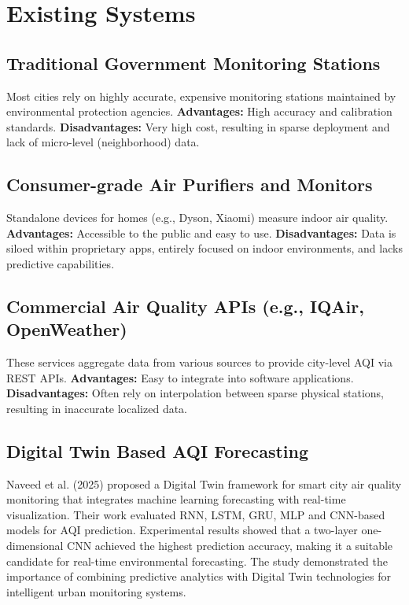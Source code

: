 \documentclass[a4paper, 12pt]{report}
\begin{document}
\section{Existing Systems}

\subsection*{Traditional Government Monitoring Stations}
Most cities rely on highly accurate, expensive monitoring stations maintained by environmental protection agencies.
\textbf{Advantages:} High accuracy and calibration standards.
\textbf{Disadvantages:} Very high cost, resulting in sparse deployment and lack of micro-level (neighborhood) data.

\subsection*{Consumer-grade Air Purifiers and Monitors}
Standalone devices for homes (e.g., Dyson, Xiaomi) measure indoor air quality.
\textbf{Advantages:} Accessible to the public and easy to use.
\textbf{Disadvantages:} Data is siloed within proprietary apps, entirely focused on indoor environments, and lacks predictive capabilities.

\subsection*{Commercial Air Quality APIs (e.g., IQAir, OpenWeather)}
These services aggregate data from various sources to provide city-level AQI via REST APIs.
\textbf{Advantages:} Easy to integrate into software applications.
\textbf{Disadvantages:} Often rely on interpolation between sparse physical stations, resulting in inaccurate localized data.

\subsection*{Digital Twin Based AQI Forecasting}
Naveed et al. (2025) proposed a Digital Twin framework for smart city air
quality monitoring that integrates machine learning forecasting with
real-time visualization. Their work evaluated RNN, LSTM, GRU, MLP and
CNN-based models for AQI prediction. Experimental results showed that a
two-layer one-dimensional CNN achieved the highest prediction accuracy,
making it a suitable candidate for real-time environmental forecasting.
The study demonstrated the importance of combining predictive analytics
with Digital Twin technologies for intelligent urban monitoring systems.
\end{document}

